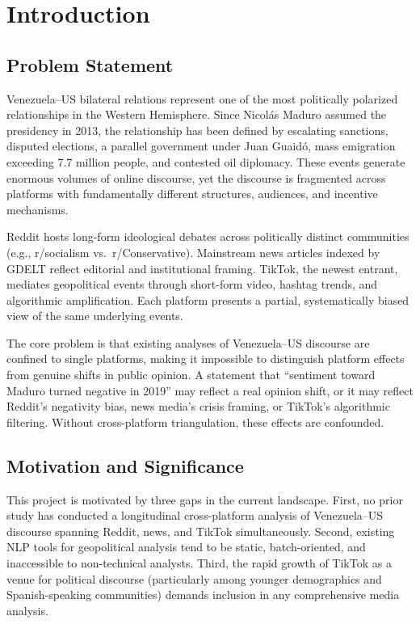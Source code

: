 \documentclass[12pt, letterpaper]{article}
\begin{document}
\section{Introduction}

\subsection{Problem Statement}

Venezuela--US bilateral relations represent one of the most politically polarized relationships in the Western Hemisphere. Since Nicol\'{a}s Maduro assumed the presidency in 2013, the relationship has been defined by escalating sanctions, disputed elections, a parallel government under Juan Guaid\'{o}, mass emigration exceeding 7.7 million people, and contested oil diplomacy. These events generate enormous volumes of online discourse, yet the discourse is fragmented across platforms with fundamentally different structures, audiences, and incentive mechanisms.

Reddit hosts long-form ideological debates across politically distinct communities (e.g., r/socialism vs.\ r/Conservative). Mainstream news articles indexed by GDELT reflect editorial and institutional framing. TikTok, the newest entrant, mediates geopolitical events through short-form video, hashtag trends, and algorithmic amplification. Each platform presents a partial, systematically biased view of the same underlying events.

The core problem is that existing analyses of Venezuela--US discourse are confined to single platforms, making it impossible to distinguish platform effects from genuine shifts in public opinion. A statement that ``sentiment toward Maduro turned negative in 2019'' may reflect a real opinion shift, or it may reflect Reddit's negativity bias, news media's crisis framing, or TikTok's algorithmic filtering. Without cross-platform triangulation, these effects are confounded.

\subsection{Motivation and Significance}

This project is motivated by three gaps in the current landscape. First, no prior study has conducted a longitudinal cross-platform analysis of Venezuela--US discourse spanning Reddit, news, and TikTok simultaneously. Second, existing NLP tools for geopolitical analysis tend to be static, batch-oriented, and inaccessible to non-technical analysts. Third, the rapid growth of TikTok as a venue for political discourse (particularly among younger demographics and Spanish-speaking communities) demands inclusion in any comprehensive media analysis.
\end{document}
